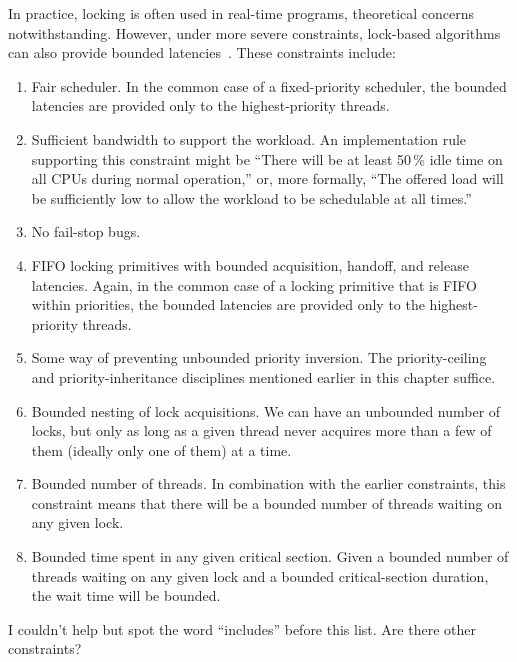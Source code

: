 In practice, locking is often used in real-time programs, theoretical
concerns notwithstanding.
However, under more severe constraints, lock-based
algorithms can also provide bounded latencies~\cite{BjoernBrandenburgPhD}.
These constraints include:

\begin{enumerate}
\item	Fair scheduler.
	In the common case of a fixed-priority scheduler, the bounded
	latencies are provided only to the highest-priority threads.
\item	Sufficient bandwidth to support the workload.
	An implementation rule supporting this constraint might be
	``There will be at least 50\,\% idle time on all CPUs
	during normal operation,''
	or, more formally, ``The offered load will be sufficiently low
	to allow the workload to be schedulable at all times.''
\item	No fail-stop bugs.
\item	FIFO locking primitives with bounded acquisition, handoff,
	and release latencies.
	Again, in the common case of a locking primitive that is FIFO
	within priorities, the bounded latencies are provided only
	to the highest-priority threads.
\item	Some way of preventing unbounded priority inversion.
	The priority-ceiling and priority-inheritance disciplines
	mentioned earlier in this chapter suffice.
\item	Bounded nesting of lock acquisitions.
	We can have an unbounded number of locks, but only as long as a
	given thread never acquires more than a few of them (ideally only
	one of them) at a time.
\item	Bounded number of threads.
	In combination with the earlier constraints, this constraint means
	that there will be a bounded number of threads waiting on any
	given lock.
\item	Bounded time spent in any given critical section.
	Given a bounded number of threads waiting on any given lock and
	a bounded critical-section duration, the wait time will be bounded.
\end{enumerate}

\QuickQuiz{}
	I couldn't help but spot the word ``includes'' before this list.
	Are there other constraints?
 \QuickQuizEnd

